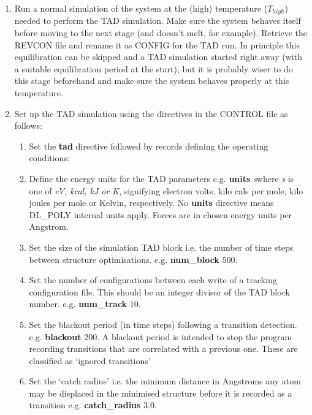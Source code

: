 \begin{enumerate}
\item Run a normal simulation of the system at the (high) temperature 
($T_{high}$) needed to perform the TAD simulation. Make sure the
system behaves itself before moving to the next stage (and doesn't
melt, for example). Retrieve the REVCON file and rename it as CONFIG
for the TAD run. In principle this equilibration can be skipped and a
TAD simulation started right away (with a suitable equilibration
period at the start), but it is probably wiser to do this stage
beforehand and make sure the system behaves properly at this
temperature.
\item Set up the TAD simulation using the directives in the CONTROL 
file as follows:
\begin{enumerate}
\item Set the {\bf tad} directive followed by records defining the
operating conditions:
\item Define the energy units for the TAD parameters e.g. \newline
 {\bf units} {\em s}\newline where {\em s} is one of {\em eV, kcal, kJ
 or K}, signifying electron volts, kilo cals per mole, kilo joules per
 mole or Kelvin, respectively. No {\bf units} directive means DL\_POLY
 internal units apply. Forces are in chosen energy units per Angstrom.
\item Set the size of the simulation TAD block i.e. the number of
  time steps between structure optimisations. e.g. \newline
  {\bf num\_block} 500.
\item Set the number of configurations between each write of a tracking
  configuration file. This should be an integer divisor of the TAD
  block number. e.g. \newline
  {\bf num\_track} 10.
\item Set the blackout period (in time steps) following a transition
  detection. e.g. \newline
  {\bf blackout} 200.\newline
  A blackout period is intended to stop the program recording
  transitions that are correlated with a previous one. These are
  classified as `ignored transitions'
\item Set the `catch radius' i.e. the minimum distance 
  in Angstroms any atom may be displaced in the minimised structure
  before it is recorded as a transition e.g. \newline
  {\bf catch\_radius} 3.0.

\end{enumerate}
\end{enumerate}
